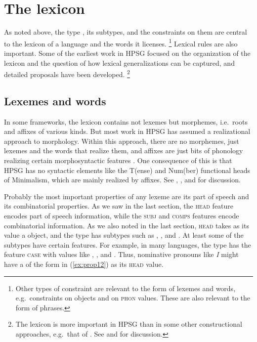 \documentclass[output=paper
	        ,collection
	        ,collectionchapter
 	        ,biblatex
                ,babelshorthands
                ,newtxmath
                ,draftmode
                ,colorlinks, citecolor=brown
]{langscibook}
\begin{document}
\section{The lexicon}\label{sec:prop4}
\label{prop:sec-lexicon}

As noted above, the type , its subtypes, and the constraints on them are central to the lexicon of a language and the words it licenses.%
%
\footnote{\label{fn-constraints-synsem-phon}%
Other types of constraint are relevant to the form of lexemes and words, e.g.\ constraints on  objects and on \textsc{phon} values. These are also relevant to the form of phrases.}
%
Lexical rules are also important. Some of the earliest work in HPSG focused on the organization of the lexicon and the question of how lexical generalizations can be captured, and detailed proposals have been developed.%
%
\footnote{The lexicon is more important in HPSG than in some other constructional approaches, e.g.\ that of \citet{Goldberg95a,Goldberg2006a}. See \citet{MWArgSt} and  for discussion.}
%

\subsection{Lexemes and words}\label{sec:prop4.1}
\label{properties:lexemes-and-words}

In some frameworks, the lexicon contains not lexemes but morphemes, i.e.\ roots and affixes of various kinds. But most work in HPSG has assumed a realizational approach to morphology. Within this approach, there are no morphemes, just lexemes and the words that realize them, and affixes are just bits of phonology realizing certain morphosyntactic features \citep{Stump2001a,Anderson92a-u}. One consequence of this is that HPSG has no syntactic elements like the T(ense) and Num(ber) functional heads of Minimalism\indexmp, which are mainly realized by affixes. See , , and  for discussion.

Probably the most important properties of any lexeme are its part of speech and its combinatorial properties. As we saw in the last section, the \textsc{head} feature encodes part of speech information, while the \textsc{subj} and \textsc{comps} features encode combinatorial information. As we also noted in the last section, \textsc{head} takes as its value a  object, and the type  has subtypes such as , , and . At least some of the subtypes have certain features. For example, in many languages, the type  has the feature \textsc{case} with values like , , and . Thus, nominative pronouns like \emph{I} might have a  of the form in (\ref{ex:prop12}) as its \textsc{head} value.
\end{document}
